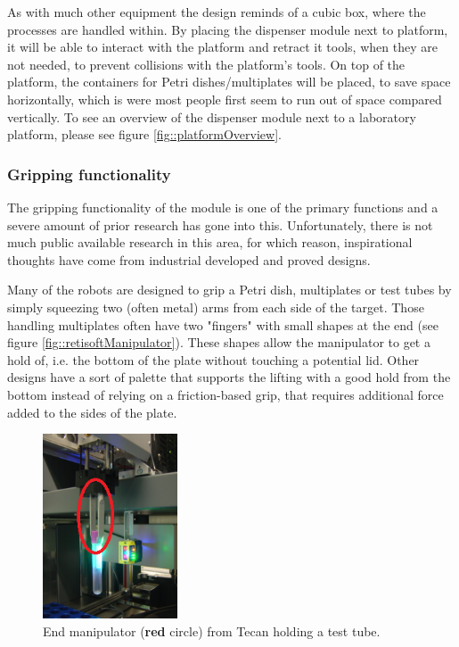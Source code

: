 \documentclass[10pt,a4paper]{article}
\begin{document}
	As with much other equipment the design reminds of a cubic box, where the processes are handled within. By placing the dispenser module next to platform, it will be able to interact with the platform and retract it tools, when they are not needed, to prevent collisions with the platform's tools. On top of the platform, the containers for Petri dishes/multiplates will be placed, to save space horizontally, which is were most people first seem to run out of space compared vertically. To see an overview of the dispenser module next to a laboratory platform, please see figure \ref{fig::platformOverview}.
	
		
	\subsubsection{Gripping functionality}	
	The gripping functionality of the module is one of the primary functions and a severe amount of prior research has gone into this. Unfortunately, there is not much public available research in this area, for which reason, inspirational thoughts have come from industrial developed and proved designs.
	
	Many of the robots are designed to grip a Petri dish, multiplates or test tubes by simply squeezing two (often metal) arms from each side of the target.
	Those handling multiplates\cite{agilentTechnologies-benchBotRobot_webpage} \cite{agilentTechnologies-directDriveRobot_webpage} \cite{festo_webpage}  \cite{hudsonRobotics_webpage} \cite{labcyte_webpage} \cite{neotecBio-automation_webpage} \cite{neotecBio-robotics_webpage} \cite{retisoftDnaSnp_webpage} \cite{retisoftFlex_webpage} \cite{tecan_webpage} \cite{ttpLabtech_webpage} often have two "fingers" with small shapes at the end (see figure \ref{fig::retisoftManipulator}). These shapes allow the manipulator to get a hold of, i.e. the bottom of the plate without touching a potential lid. Other designs have a sort of palette that supports the lifting with a good hold from the bottom instead of relying on a friction-based grip, that requires additional force added to the sides of the plate. 
	
	\begin{figure}
		\includegraphics[width=4cm]{images/tecanTestTube.png}
		\caption{End manipulator ({\color{red}\textbf{red}} circle) from Tecan\cite{tecan_webpage} holding a test tube.}
		\label{fig:tecanTestTube}
	\end{figure}
		
\end{document}
